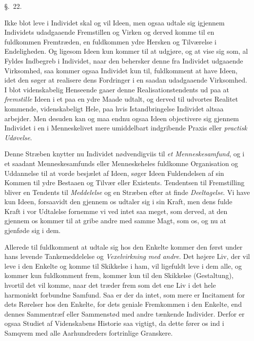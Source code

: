 \documentclass[12pt,a4paper]{book}
\newcommand{\apage}[1]{\marginnote{\footnotesize\textit{[#1]}}}
\begin{document}
\begin{center}\large\S.~22.\end{center} \apage{194} 

Ikke blot leve i Individet skal og vil Ideen, men ogsaa udtale sig igjennem
Individets udadgaaende Fremstillen og Virken og derved komme til en fuldkommen
Fremtræden, en fuldkommen ydre Hersken og Tilværelse i Endeligheden. Og ligesom
Ideen kun kommer til at udgjøre, og at vise sig som, al Fyldes Indbegreb i
Individet, naar den behersker denne fra Individet udgaaende Virksomhed, saa kommer
ogsaa Individet kun til, fuldkomment at have Ideen, idet den søger at realisere
dens Fordringer i en saadan udadgaaende Virksomhed. I blot videnskabelig Henseende gaaer denne Realisationstendents ud paa at
\emph{fremstille} Ideen i et paa en ydre Maade udtalt, og derved til udvortes Realitet
kommende, videnskabeligt Hele, paa hvis Istandbringelse Individet altsaa arbejder.
Men desuden kan og maa endnu ogsaa Ideen objectivere sig gjennem Individet i en i
Menneskelivet mere umiddelbart indgribende Praxis eller \emph{practisk Udøvelse}.

Denne Stræben knytter nu Individet nødvendigviis til \emph{et Menneskesamfund}, og
i et saadant Menneskesamfunds eller Menneskeheles fuldkomne Organisation og
Uddannelse til at vorde besjælet af Ideen, søger Ideen Fuldendelsen af sin Kommen
til ydre Bestaaen og Tilvær eller Existents. Tendentsen til Fremstilling bliver en
\apage{195} Tendents til \emph{Meddelelse} og en Stræben efter at finde \emph{Deeltagelse}. Vi have
kun Ideen, forsaavidt den gjennem os udtaler sig i sin Kraft, men dens fulde Kraft
i vor Udtalelse fornemme vi ved intet saa meget, som derved, at den gjennem os
kommer til at gribe andre med samme Magt, som os, og nu at gjenføde sig i dem.

Allerede til fuldkomment at udtale sig hos den Enkelte kommer den først under hans
levende Tankemeddelelse og \emph{Vexelvirkning med andre}. Det højere Liv, der vil leve i den Enkelte og komme til Skikkelse i ham, vil
ligefuldt leve i dem alle, og kommer kun fuldkomment frem, kommer kun til den
Skikkelse (Gestaltung), hvortil det vil komme, naar det træder frem som det ene Liv
i det hele harmoniskt forbundne Samfund. Saa er der da intet, som mere er
Incitament for dets Rørelser hos den Enkelte, for dets geniale Fremkommen i den
Enkelte, end dennes Sammentræf eller Sammenstød med andre tænkende Individer.
Derfor er ogsaa Studiet af Videnskabens Historie saa vigtigt, da dette fører os ind
i Samqvem med alle Aarhundreders fortrinlige Granskere.
\end{document}
